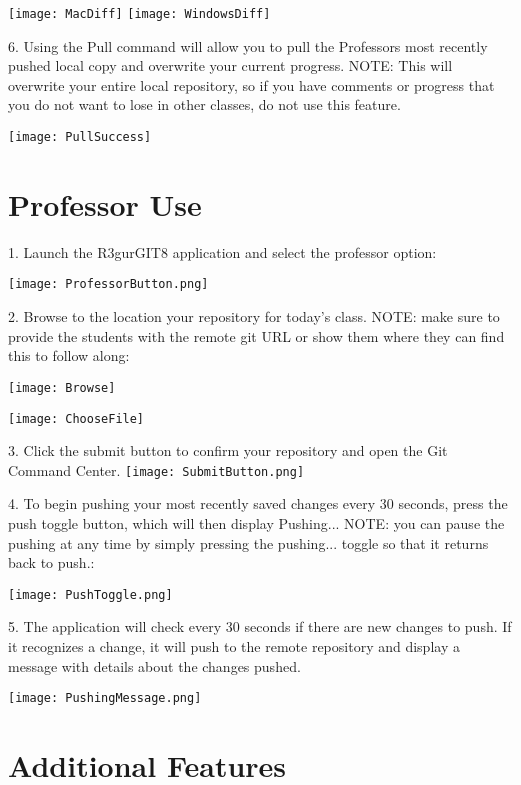\documentclass{article}
\begin{document}
\texttt{[image: MacDiff]}
\texttt{[image: WindowsDiff]}

\newpage

6. Using the Pull command will allow you to pull the Professors most recently pushed local copy and overwrite your current progress.  NOTE: This will overwrite your entire local repository, so if you have comments or progress that you do not want to lose in other classes, do not use this feature.

\texttt{[image: PullSuccess]}

\newpage

\section{Professor Use}

1. Launch the R3gurGIT8 application and select the professor option:

\texttt{[image: ProfessorButton.png]}

2. Browse to the location your repository for today's class. NOTE: make sure to provide the students with the remote git URL or show them where they can find this to follow along:

\texttt{[image: Browse]}

\texttt{[image: ChooseFile]}

3. Click the submit button to confirm your repository and open the Git Command Center.
\texttt{[image: SubmitButton.png]}

4. To begin pushing your most recently saved changes every 30 seconds, press the push toggle button, which will then display Pushing...  NOTE: you can pause the pushing at any time by simply pressing the pushing... toggle so that it returns back to push.:

\texttt{[image: PushToggle.png]}


5. The application will check every 30 seconds if there are new changes to push.  If it recognizes a change, it will push to the remote repository and display a message with details about the changes pushed.



\texttt{[image: PushingMessage.png]}

\newpage

\section{Additional Features}
\end{document}
